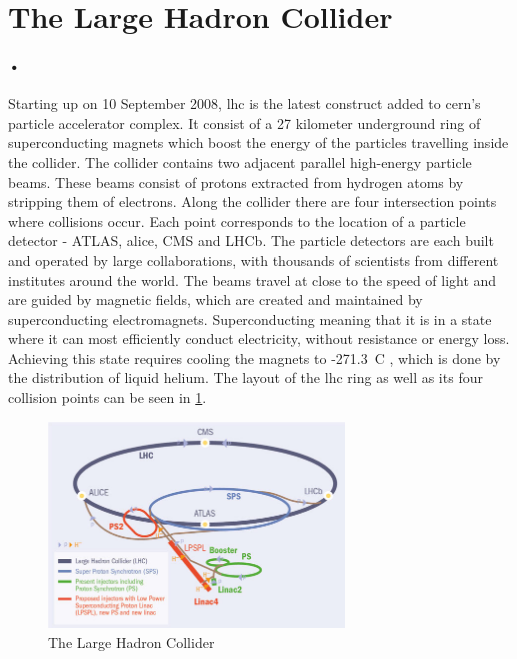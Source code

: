 \documentclass[a4paper, 12pt]{report}
\begin{document}
\section{The Large Hadron Collider}
\label{sec:lhc}
\paragraph{•}
Starting up on 10 September 2008, \gls{lhc} is the latest construct added to \gls{cern}'s particle accelerator complex\cite{lhc}.
It consist of a 27 kilometer underground ring of superconducting magnets which boost the energy of the particles travelling inside the collider.
The collider contains two adjacent parallel high-energy particle beams.
These beams consist of protons extracted from hydrogen atoms by stripping them of electrons.
Along the collider there are four intersection points where collisions occur.
Each point corresponds to the location of a particle detector - ATLAS, \gls{alice}, CMS and LHCb.
The particle detectors are each built and operated by large collaborations, with thousands of scientists from different institutes around the world.
The beams travel at close to the speed of light and are guided by magnetic fields, which are created and maintained by superconducting electromagnets.
Superconducting meaning that it is in a state where it can most efficiently conduct electricity, without resistance or energy loss.
Achieving this state requires cooling the magnets to -271.3\degree~C , which is done by the distribution of liquid helium.
The layout of the \gls{lhc} ring as well as its four collision points can be seen in \ref{fig:lhc}.

\begin{figure}[h!]
  \centering
    \includegraphics[width=0.7\textwidth]{images/lhc-ring.jpg}
     \caption[The Large Hadron Collider]{The Large Hadron Collider \cite{lhc-ring-image}}
    \label{fig:lhc}
\end{figure}
\end{document}
